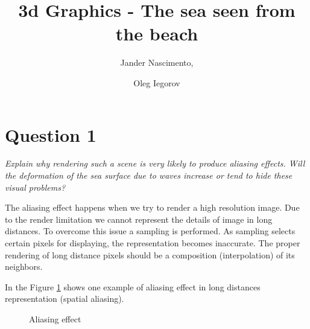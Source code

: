 \documentclass{article}
\begin{document}
\title{3d Graphics - The sea seen from the beach}

\author{Jander Nascimento, 
\and Oleg Iegorov}

\maketitle

\section{Question 1}

\emph{Explain why rendering such a scene is very likely to produce
aliasing effects. Will the deformation of the sea surface due to waves
increase or tend to hide these visual problems?}

The aliasing effect happens when we try to render a high resolution image\cite{iaow}. Due to the render limitation we cannot represent the details of image in long distances. To overcome this issue a sampling is performed. As sampling selects certain pixels for displaying, the representation becomes inaccurate. The proper rendering of long distance pixels should be a composition (interpolation) of its neighbors.

In the Figure \ref{fig:aliasing} shows one example of aliasing effect in long distances representation (spatial aliasing).

\begin{figure}[H]
		  \centering
		  \hspace{0.1cm}
		  \caption{Aliasing effect}
		  \label{fig:aliasing}
\end{figure}
\end{document}
